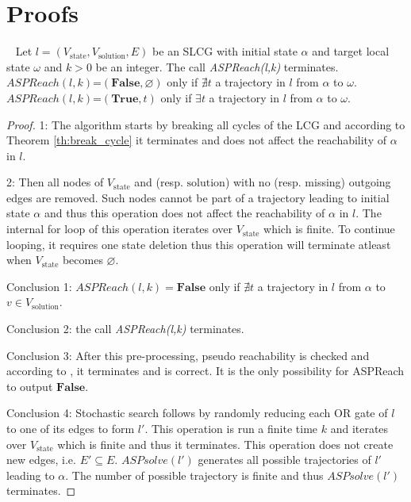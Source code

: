 \chapter{Proofs}\label{sec:proof}
\begin{theorem} ~
    Let $l=(V_{\mathrm{state}}, V_{\mathrm{solution}}, E)$ be an SLCG with initial state $\alpha$ and target local state $\omega$ and $k > 0$ be an integer.
    The call \textit{ASPReach(l,k)} terminates.\\
    $ASPReach(l,k)$=$(\mathbf{False},\varnothing)$ only if $\nexists t$ a trajectory in $l$ from $\alpha$ to $\omega$.\\
    $ASPReach(l,k)$=$(\mathbf{True},t)$ only if $\exists t$ a trajectory in $l$ from $\alpha$ to $\omega$.
    \begin{proof}
    
        1: The algorithm starts by breaking all cycles of the LCG and according to Theorem \ref{th:break_cycle} it terminates and does not affect the reachability of $\alpha$ in $l$.
        
        2: Then all nodes of $V_{\mathrm{state}}$ and (resp. ${\mathrm{solution}}$) with no (resp. missing) outgoing edges are removed.
        Such nodes cannot be part of a trajectory leading to initial state $\alpha$ and thus this operation does not affect the reachability of $\alpha$ in $l$.
        The internal for loop of this operation iterates over $V_{\mathrm{state}}$ which is finite.
        To continue looping, it requires one state deletion thus this operation will terminate atleast when $V_{\mathrm{state}}$ becomes $\varnothing$.
        
        Conclusion 1: $ASPReach(l,k)=\mathbf{False}$ only if $\nexists t$ a trajectory in $l$ from $\alpha$ to $v \in V_{\mathrm{solution}}$.
        
        Conclusion 2: the call \textit{ASPReach(l,k)} terminates.
        
        Conclusion 3: After this pre-processing, pseudo reachability is checked and according to \cite{pauleve2012}, it terminates and is correct.
        It is the only possibility for ASPReach to output $\mathbf{False}$.
        
        Conclusion 4: Stochastic search follows by randomly reducing each OR gate of $l$ to one of its edges to form $l'$.
        This operation is run a finite time $k$ and iterates over $V_{\mathrm{state}}$ which is finite and thus it terminates.
        This operation does not create new edges, i.e. $E' \subseteq E$.
        $ASPsolve(l')$ generates all possible trajectories of $l'$ leading to $\alpha$.
        The number of possible trajectory is finite and thus $ASPsolve(l')$ terminates.
        

\end{proof}
\end{theorem}
